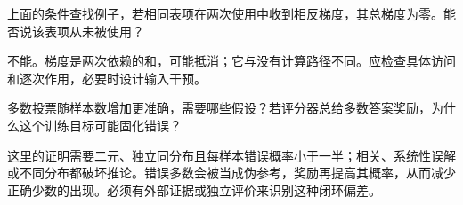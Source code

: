 \begin{exercise}
上面的条件查找例子，若相同表项在两次使用中收到相反梯度，其总梯度为零。能否说该表项从未被使用？
\end{exercise}
\begin{solution}
不能。梯度是两次依赖的和，可能抵消；它与没有计算路径不同。应检查具体访问和逐次作用，必要时设计输入干预。
\end{solution}
\begin{exercise}
多数投票随样本数增加更准确，需要哪些假设？若评分器总给多数答案奖励，为什么这个训练目标可能固化错误？
\end{exercise}
\begin{solution}
这里的证明需要二元、独立同分布且每样本错误概率小于一半；相关、系统性误解或不同分布都破坏推论。错误多数会被当成伪参考，奖励再提高其概率，从而减少正确少数的出现。必须有外部证据或独立评价来识别这种闭环偏差。
\end{solution}

